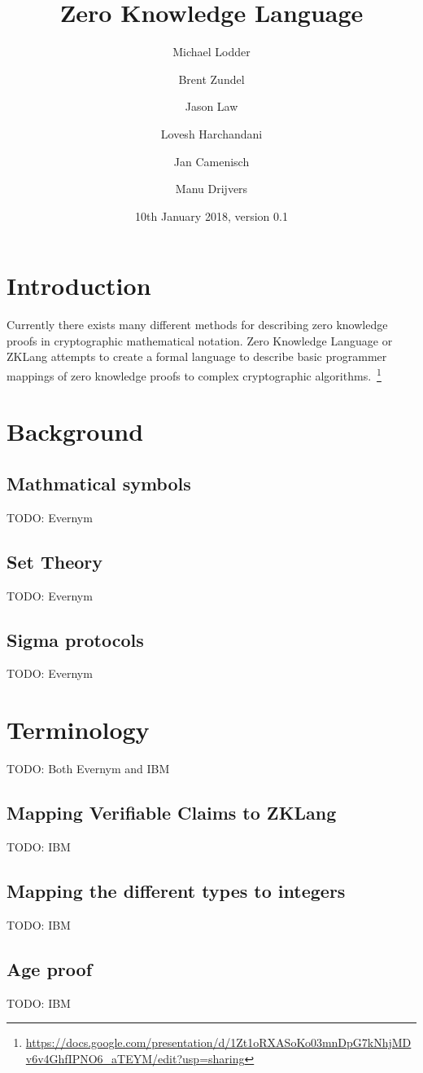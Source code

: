 \documentclass[a4paper]{article}
\title{Zero Knowledge Language}
\author[1]{Michael Lodder}
\author[1]{Brent Zundel}
\author[1]{Jason Law}
\author[1]{Lovesh Harchandani}
\author[2]{Jan Camenisch}
\author[2]{Manu Drijvers}
\affil[1]{Evernym}
\affil[2]{IBM Zurich}
\date{10th January 2018, version 0.1}
\begin{document}
\maketitle

\section{Introduction}
Currently there exists many different methods for describing zero knowledge proofs in cryptographic mathematical notation. Zero Knowledge Language or ZKLang attempts to create a formal language to describe basic programmer mappings of zero knowledge proofs to complex cryptographic algorithms.~\footnote{\url{https://docs.google.com/presentation/d/1Zt1oRXASoKo03mnDpG7kNhjMDv6v4GhfIPNO6_aTEYM/edit?usp=sharing}}

\section{Background}

\subsection{Mathmatical symbols}
TODO: Evernym

\subsection{Set Theory}
TODO: Evernym

\subsection{Sigma protocols}
TODO: Evernym

\section{Terminology}
TODO: Both Evernym and IBM


\subsection{Mapping Verifiable Claims to ZKLang}
TODO: IBM

\subsection{Mapping the different types to integers}
TODO: IBM

\subsection{Age proof}
TODO: IBM
\end{document}

